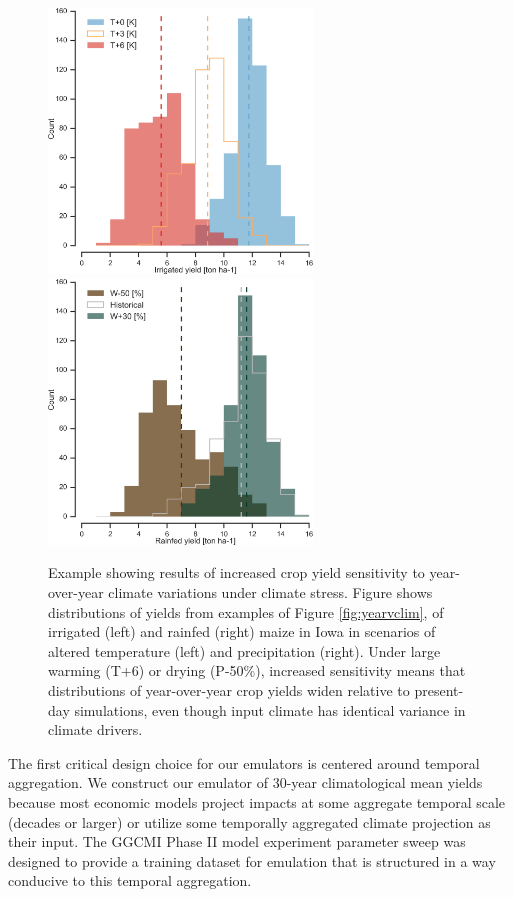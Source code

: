 \documentclass[gmd, manuscript]{copernicus} %
\begin{document}
\begin{figure}[ht]
\centering
   \includegraphics[width=7cm]{figures/hist_year_t.png} \hspace{10mm} \includegraphics[width=7cm]{figures/hist_year_pr.png}
   \caption{
   Example showing results of increased crop yield sensitivity to year-over-year climate variations under climate stress. 
   Figure shows distributions of yields from examples of Figure \ref{fig:yearvclim}, of irrigated (left) and rainfed (right) maize in Iowa in scenarios of altered temperature (left) and precipitation (right).
   Under large warming (T+6) or drying (P-50\%), increased sensitivity means that distributions of year-over-year crop yields widen relative to present-day simulations, even though input climate has identical variance in climate drivers.
   }
   \label{fig:yearly}
\end{figure}

The first critical design choice for our emulators is centered around temporal aggregation.
We construct our emulator of 30-year climatological mean yields because most economic models project impacts at some aggregate temporal scale (decades or larger) or utilize some temporally aggregated climate projection as their input.
The GGCMI Phase II model experiment parameter sweep was designed to provide a training dataset for emulation that is structured in a way conducive to this temporal aggregation.
\end{document}
